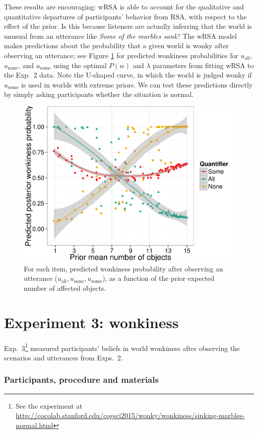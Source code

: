 \documentclass[10pt,letterpaper]{article}
\newcommand{\figref}[1]{Figure \ref{#1}}
\begin{document}
These results are encouraging: wRSA is able to account for the qualitative and quantitative departures of participants' behavior from RSA, with respect to the effect of the prior.
Is this because listeners are actually inferring that the world is unusual from an utterance like \emph{Some of the marbles sank}?
The wRSA model makes predictions about the probability that a given world is wonky after observing an utterance; see \figref{fig:wonkymodel} for predicted wonkiness probabilities for $u_{\textrm{all}}$, $u_{\textrm{none}}$, and $u_{\textrm{some}}$ using the  optimal $P(w)$ and $\lambda$ parameters from fitting wRSA to the Exp.~2 data.
Note the U-shaped curve, in which the world is judged wonky if $u_{\textrm{some}}$ is used in worlds with extreme priors.
 We can test these predictions directly by simply asking participants whether the situation is normal.



\begin{figure}
	\centering
	\includegraphics[width=.43\textwidth]{pics/model-wonkiness-uniform}
	\caption{For each item, predicted wonkiness probability after observing an utterance ($u_{\textrm{all}}, u_{\textrm{none}}, u_{\textrm{some}}$), as a function of the prior expected number of affected objects.}
	\label{fig:wonkymodel}	
\end{figure}

\section{Experiment 3: wonkiness}

Exp.~3\footnote{See the experiment at \url{http://cocolab.stanford.edu/cogsci2015/wonky/wonkiness/sinking-marbles-normal.html}} measured participants' beliefs in world wonkiness after observing the scenarios and utterances from Exps.~2.

\subsubsection{Participants, procedure and materials}
\end{document}
